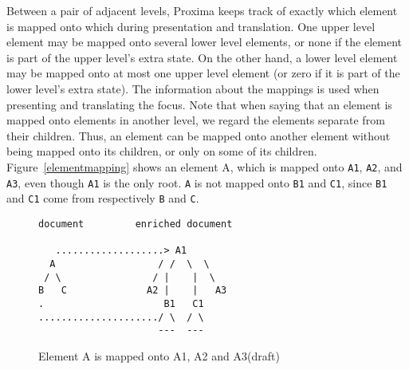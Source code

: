Between a pair of adjacent levels, Proxima keeps track of exactly which element is mapped onto which during presentation and translation.  One upper level element may be mapped onto several lower level elements, or none if the element is part of the upper level's extra state. On the other hand, a lower level element may be mapped onto at most one upper level element (or zero if it is part of the lower level's extra state). The information about the mappings is used when presenting and translating the focus. Note that when saying that an element is mapped onto elements in another level, we regard the elements separate from their children. Thus, an element can be mapped onto another element without being mapped onto its children, or only on some of its children. Figure~\ref{elementmapping} shows an element A, which is mapped onto \verb|A1|, \verb|A2|, and \verb|A3|, even though \verb|A1| is the only root. \verb|A| is not mapped onto \verb|B1| and \verb|C1|, since \verb|B1| and \verb|C1| come from respectively \verb|B| and \verb|C|.  

\begin{figure}
\begin{small}
\begin{center}
\begin{verbatim}
document         enriched document

   ...................> A1
  A                  / /  \  \ 
 / \                / |    |  \ 
B   C              A2 |    |   A3
.                     B1   C1  
...................../ \  / \
                     ---  ---
\end{verbatim}
\caption{Element A is mapped onto A1, A2 and A3(draft)}\label{unpresentableFocus} 
\end{center}
\end{small}
\end{figure}


